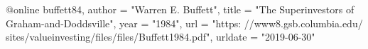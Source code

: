  @online{
buffett84,
author = "Warren E. Buffett",
title = "The Superinvestors of Graham-and-Doddsville",
year = "1984",
url = "https: //www8.gsb.columbia.edu/ sites/valueinvesting/files/files/Buffett1984.pdf",
urldate = "2019-06-30"
} 
